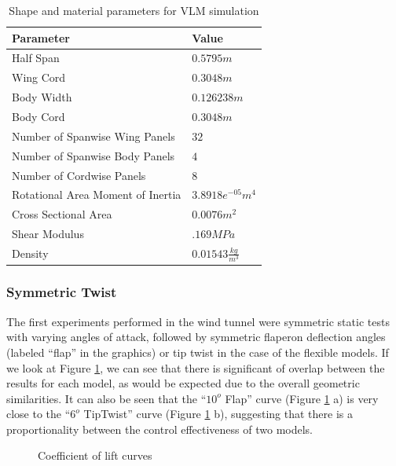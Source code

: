 \documentclass[11pt]{ucthesis}
\begin{document}
\begin{table}[h]
\begin{center}
\caption{Shape and material parameters for VLM simulation}
\label{tab:vlmConfig}
\begin{tabular}{  p{6cm} p{1.9cm}}
Parameter&Value\\\hline
Half Span&$0.5795m$\\
Wing Cord&$0.3048m$\\
Body Width&$0.126238m$\\
Body Cord&$0.3048m$\\
Number of Spanwise Wing Panels&$32$\\
Number of Spanwise Body Panels&$4$\\
Number of Cordwise Panels&$8$\\
Rotational Area Moment of Inertia&$3.8918e^{-05}m^4$\\
Cross Sectional Area&$0.0076m^2$\\
Shear Modulus&$.169 MPa$\\
Density&$0.01543\frac{kg}{m^3}$\\
\end{tabular}
\end{center}
\end{table}  

\subsubsection{Symmetric Twist}
The first experiments performed in the wind tunnel were symmetric static tests with varying angles of attack, followed by symmetric flaperon deflection angles (labeled “flap” in the graphics) or tip twist in the case of the flexible models. If we look at Figure \ref{fig:CL}, we can see that there is significant of overlap between the results for each model, as would be expected due to the overall geometric similarities. It can also be seen that the “$10^o$ Flap” curve (Figure \ref{fig:CL} a) is very close to the “$6^o$ TipTwist” curve (Figure \ref{fig:CL} b), suggesting that there is a proportionality between the control effectiveness of two models.

\begin{figure}[h]
\hfill
{}
\hfill
{}
\hfill
\caption{Coefficient of lift curves}
\label{fig:CL}
\end{figure}
\end{document}
